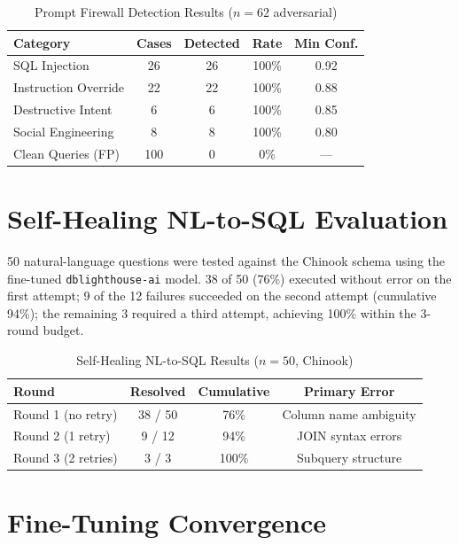 \documentclass[12pt,a4paper]{report}
\begin{document}
\begin{table}[htbp]
\caption{Prompt Firewall Detection Results ($n=62$ adversarial)}
\label{tab:fwresults}
\centering
\begin{tabular}{lcccc}
\toprule
\textbf{Category} & \textbf{Cases} & \textbf{Detected} & \textbf{Rate} & \textbf{Min Conf.} \\
\midrule
SQL Injection       & 26  & 26 & 100\% & 0.92 \\
Instruction Override & 22 & 22 & 100\% & 0.88 \\
Destructive Intent  & 6   & 6  & 100\% & 0.85 \\
Social Engineering  & 8   & 8  & 100\% & 0.80 \\
Clean Queries (FP)  & 100 & 0  & 0\%   & ---  \\
\bottomrule
\end{tabular}
\end{table}

\section{Self-Healing NL-to-SQL Evaluation}

50 natural-language questions were tested against the Chinook schema using the fine-tuned \texttt{dblighthouse-ai} model. 38 of 50 (76\%) executed without error on the first attempt; 9 of the 12 failures succeeded on the second attempt (cumulative 94\%); the remaining 3 required a third attempt, achieving 100\% within the 3-round budget.

\begin{table}[htbp]
\caption{Self-Healing NL-to-SQL Results ($n=50$, Chinook)}
\label{tab:nlsql}
\centering
\begin{tabular}{lccc}
\toprule
\textbf{Round} & \textbf{Resolved} & \textbf{Cumulative} & \textbf{Primary Error} \\
\midrule
Round 1 (no retry)  & 38 / 50 & 76\%  & Column name ambiguity \\
Round 2 (1 retry)   & 9 / 12  & 94\%  & JOIN syntax errors \\
Round 3 (2 retries) & 3 / 3   & 100\% & Subquery structure \\
\bottomrule
\end{tabular}
\end{table}

\section{Fine-Tuning Convergence}
\end{document}

